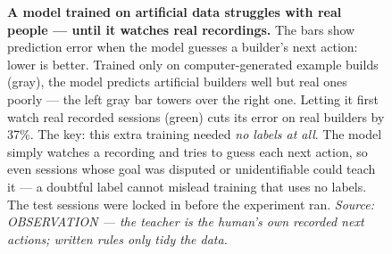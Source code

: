 \documentclass[11pt]{article}
\begin{document}
\begin{figure}[h]
\centering
{}
\caption{\textbf{A model trained on artificial data struggles with real people
--- until it watches real recordings.} The bars show prediction error when the
model guesses a builder's next action: lower is better. Trained only on
computer-generated example builds (gray), the model predicts artificial
builders well but real ones poorly --- the left gray bar towers over the right
one. Letting it first watch real recorded sessions (green) cuts its error on
real builders by 37\%. The key: this extra training needed \emph{no labels at
all}. The model simply watches a recording and tries to guess each next
action, so even sessions whose goal was disputed or unidentifiable could
teach it --- a doubtful label cannot mislead training that uses no labels.
The test sessions were locked in before the experiment ran.
\textit{Source: OBSERVATION --- the teacher is the human's own recorded next
actions; written rules only tidy the data.}}
\end{figure}
\end{document}
